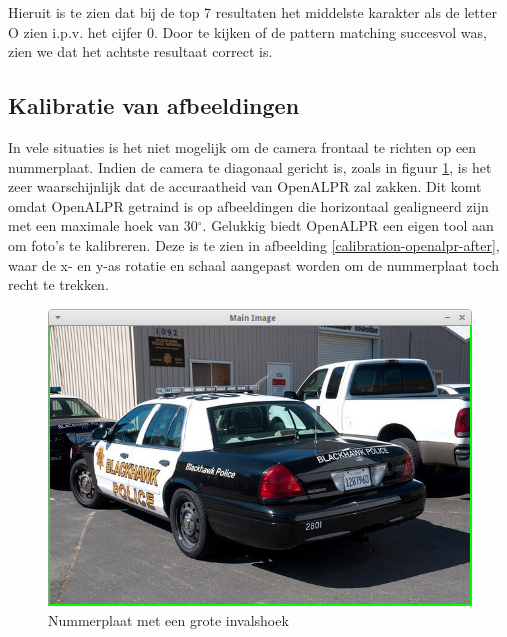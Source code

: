 Hieruit is te zien dat bij de top 7 resultaten het middelste karakter als de letter O zien i.p.v. het cijfer 0. Door te kijken of de pattern matching succesvol was, zien we dat het achtste resultaat correct is.

\subsection{Kalibratie van afbeeldingen}
\label{alprcalib}
In vele situaties is het niet mogelijk om de camera frontaal te richten op een nummerplaat. Indien de camera te diagonaal gericht is, zoals in figuur \ref{calibration-openalpr}, is het zeer waarschijnlijk dat de accuraatheid van OpenALPR zal zakken. Dit komt omdat OpenALPR getraind is op afbeeldingen die horizontaal gealigneerd zijn met een maximale hoek van 30$^{\circ}$. Gelukkig biedt OpenALPR een eigen tool aan om foto's te kalibreren. Deze is te zien in afbeelding \ref{calibration-openalpr-after}, waar de x- en y-as rotatie en schaal aangepast worden om de nummerplaat toch recht te trekken.

\begin{figure}[h!]
	\centering
	\includegraphics[width=0.7\linewidth]{img/calibration/configuration_calibration_before.jpg}
	\caption{Nummerplaat met een grote invalshoek \autocite{openalpr2015pattern}}
	\label{calibration-openalpr}
\end{figure}

